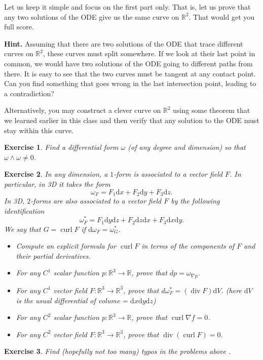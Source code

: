 \documentclass{article}
\newtheorem{q}{Exercise}
\newcommand{\R}{\mathbb R}
\newcommand{\dd}{\mathrm d}
\DeclareMathOperator{\curl}{curl}
\DeclareMathOperator{\dv}{div}
\newcommand{\hint}{\noindent \textbf{Hint. }}
\begin{document}
Let us keep it simple and focus on the first part only. That is, let us prove that any two solutions of the ODE give us the same curve on $\R^2$. That would get you full score.

\hint Assuming that there are two solutions of the ODE that trace different curves on $\R^2$, these curves must split somewhere. If we look at their last point in common, we would have two solutions of the ODE going to different paths from there. It is easy to see that the two curves must be tangent at any contact point. Can you find something that goes wrong in the last intersection point, leading to a contradiction?

Alternatively, you may construct a clever curve on $\R^2$ using some theorem that we learned earlier in this class and then verify that any solution to the ODE must stay within this curve.

\begin{q}
Find a differential form $\omega$ (of any degree and dimension) so that $\omega \wedge \omega \neq 0$.
\end{q}

\begin{q}
In any dimension, a $1$-form is associated to a vector field $F$. In particular, in 3D it takes the form
\[ \omega_F = F_1 \dd x + F_2 \dd y + F_3 \dd z.\]
In 3D, $2$-forms are also associated to a vector field $F$ by the following identification
\[ \omega^\ast_F = F_1 \dd y \dd z + F_2 \dd z \dd x + F_3 \dd x \dd y.\]
We say that $G = \curl F$ if $\mathrm d \omega_F = \omega^\ast_G$.
\begin{itemize}
	\item[(a)] Compute an explicit formula for $\curl F$ in terms of the components of $F$ and their partial derivatives.
	\item[(b)] For any $C^1$ scalar function $p : \R^3 \to \R$, prove that $dp = \omega_{\nabla p}$.
	\item[(c)] For any $C^1$ vector field $F : \R^3 \to \R^3$, prove that $d\omega^\ast_F = (\dv F) \dd V$. (here $\dd V$ is the usual differential of volume = $\dd x \dd y \dd z$)
	\item[(d)] For any $C^2$ scalar function $p : \R^3 \to \R$, prove that $\curl \nabla f = 0$.
	\item[(e)] For any $C^2$ vector field $F : \R^3 \to \R^3$, prove that $\dv (\curl F) = 0$.
\end{itemize}
\end{q}

\begin{q}
Find (hopefully not too many) typos in the problems above {\em \smiley}.
\end{q}
\end{document}
